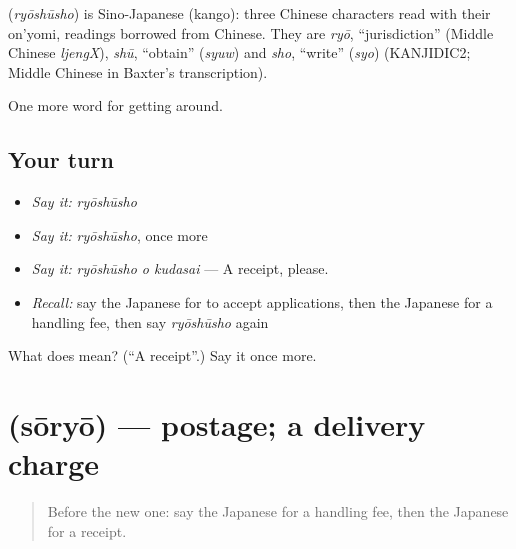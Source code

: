 \begin{cousinweb}
\textbf{} (\emph{ryōshūsho}) is Sino-Japanese (kango): three Chinese characters read with their on'yomi, readings borrowed from Chinese. They are \emph{ryō}, \textquotedblleft{}jurisdiction\textquotedblright{} (Middle Chinese \emph{ljengX}), \emph{shū}, \textquotedblleft{}obtain\textquotedblright{} (\emph{syuw}) and \emph{sho}, \textquotedblleft{}write\textquotedblright{} (\emph{syo}) (KANJIDIC2; Middle Chinese in Baxter's transcription).
\end{cousinweb}

\begin{grammarlens}[title={What you've built}]
One more word for getting around.
\end{grammarlens}

\subsection*{Your turn}
\begin{itemize}
\raggedright
  \item \emph{Say it:} \emph{ryōshūsho}
  \item \emph{Say it:} \emph{ryōshūsho}, once more
  \item \emph{Say it:} \emph{ryōshūsho o kudasai} — A receipt, please.
  \item \emph{Recall:} say the Japanese for to accept applications, then the Japanese for a handling fee, then say \emph{ryōshūsho} again
\end{itemize}

\begin{tcolorbox}[breakable,colback=teal!4,colframe=teal!35!black,title={Before you move on}]
What does  mean? (\textquotedblleft{}A receipt\textquotedblright{}.) Say it once more.
\end{tcolorbox}
\section[\texorpdfstring{\ja{そうりょう} (sōryō)}{そうりょう (sōryō)}]{ (sōryō) — postage; a delivery charge}

\label{lesson:JA-C420-souryou}



\begin{quote}
Before the new one: say the Japanese for a handling fee, then the Japanese for a receipt.
\end{quote}

